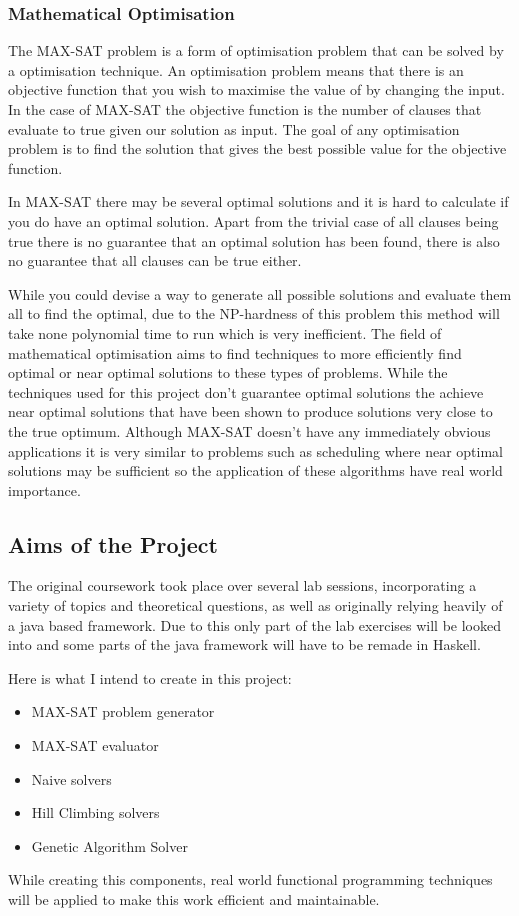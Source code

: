 \documentclass[a4paper]{article}
\begin{document}
\subsubsection{Mathematical Optimisation}
The MAX-SAT problem is a form of optimisation problem that can be solved by a optimisation technique.
An optimisation problem means that there is an objective function that you wish to maximise the value of by changing the input.
In the case of MAX-SAT the objective function is the number of clauses that evaluate to true given our solution as input.
The goal of any optimisation problem is to find the solution that gives the best possible value for the objective function.
\par
In MAX-SAT there may be several optimal solutions and it is hard to calculate if you do have an optimal solution.
Apart from the trivial case of all clauses being true there is no guarantee that an optimal solution has been found, there is also no guarantee that all clauses can be true either.
\par
While you could devise a way to generate all possible solutions and evaluate them all to find the optimal, due to the NP-hardness of this problem this method will take none polynomial time to run which is very inefficient.
The field of mathematical optimisation aims to find techniques to more efficiently find optimal or near optimal solutions to these types of problems.
While the techniques used for this project don't guarantee optimal solutions the achieve near optimal solutions that have been shown to produce solutions very close to the true optimum.
Although MAX-SAT doesn't have any immediately obvious applications it is very similar to problems such as scheduling where near optimal solutions may be sufficient so the application of these algorithms have real world importance.

\subsection{Aims of the Project}
The original coursework took place over several lab sessions, incorporating a variety of topics and theoretical questions, as well as originally relying heavily of a java based framework.
Due to this only part of the lab exercises will be looked into and some parts of the java framework will have to be remade in Haskell.
\par
Here is what I intend to create in this project:\vspace*{-4mm}
\begin{multicols}{3}
    \begin{itemize}[noitemsep,nolistsep]
        \item MAX-SAT problem generator
        \item MAX-SAT evaluator
        \item Naive solvers
        \item Hill Climbing solvers
        \item Genetic Algorithm Solver
    \end{itemize}
\end{multicols}
While creating this components, real world functional programming techniques will be applied to make this work efficient and maintainable.
\end{document}
